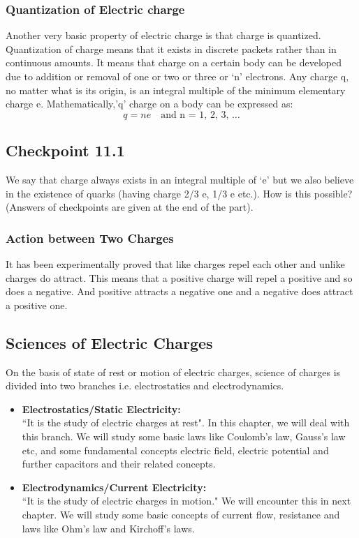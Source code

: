 \subsubsection{Quantization of Electric charge}
Another very basic property of electric charge is that charge is quantized. Quantization of charge means that it exists in discrete packets rather than in continuous amounts. It means that charge on a certain body can be developed due to addition or removal of one or two or three or ‘n’ electrons. Any charge q, no matter what is its origin, is an integral multiple of the 
minimum elementary charge e. Mathematically,'q' charge on a body can be expressed as:
\begin{equation*}
  q=ne \quad \textrm{and n = 1, 2, 3, …}
\end{equation*}
\subsection*{Checkpoint 11.1}
We say that charge always exists in an integral multiple of ‘e’ but we also believe in the existence of quarks 
(having charge 2/3 e, 1/3 e etc.). How is this possible?
(Answers of checkpoints are given at the end of the part).
\subsubsection{Action between Two Charges}
It has been experimentally proved that like 
charges repel each other and unlike charges do attract. This means 
that a positive charge will repel a positive and so does a negative. And positive 
attracts a negative one and a negative does attract a positive one.

\subsection*{Sciences of Electric Charges}
On the basis of state of rest or motion of electric charges, science 
of charges is divided into two branches i.e. electrostatics and 
electrodynamics.
\begin{itemize}
\item{\textbf{Electrostatics/Static Electricity:}}\\
``It is the study of electric charges at rest". 
In this chapter, we will deal with this branch. We will 
study some basic laws like Coulomb’s law, Gauss’s law etc, and 
some fundamental concepts electric field, electric potential 
and further capacitors and their related concepts.
\item{\textbf{Electrodynamics/Current Electricity:}}\\
``It is the study of electric charges in motion." We will encounter 
this in next chapter. We will study some basic concepts of current 
flow, resistance and laws like Ohm’s law and Kirchoff’s laws.
\end{itemize}

